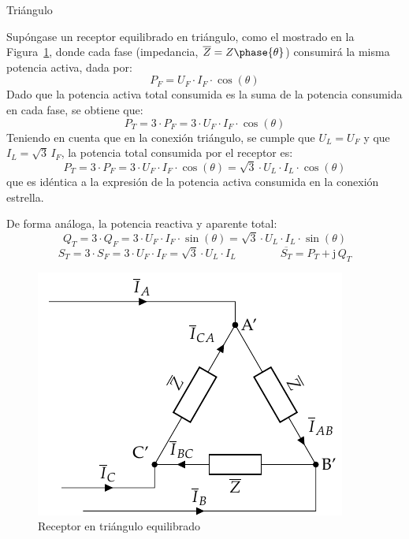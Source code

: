 \documentclass[11pt]{book} %
\makeatletter
\numberwithin{dummy}{section}
\theoremstyle{ocrenumbox}
\theoremstyle{blacknumex}
\theoremstyle{blacknumbox}
\theoremstyle{ocrenum}
\renewcommand{\subsubsection}{\@startsection {subsubsection}{3}{\z@}
{-2ex \@plus -0.1ex \@minus -.2ex}
{.2ex \@plus.2ex }
{\normalfont\small\sffamily\bfseries}}
\makeatother
\begin{document}
	\subsubsection{Triángulo}
	
	Supóngase un receptor equilibrado en triángulo, como el mostrado en la Figura~\ref{fig.trianguloEquilibrado_receptor_potencia}, donde cada fase (impedancia, $\overline{Z}=Z\phase{\theta}$) consumirá la misma potencia activa, dada por: 
	\begin{equation*}
	    P_F=U_{F}\cdot I_F \cdot \cos(\theta)
	\end{equation*}
	Dado que la potencia activa total consumida es la suma de la potencia consumida en cada fase, se obtiene que:
	\begin{equation*}
	    P_T=3\cdot P_F=3\cdot U_F\cdot I_F\cdot\cos(\theta)
	\end{equation*}
	Teniendo en cuenta que en la conexión triángulo, se cumple que $U_L=U_F$ y que $I_L=\sqrt{3}\,I_F$, la potencia total consumida por el receptor es: 
	\begin{equation}
	    \boxed{P_T=3\cdot P_F=3\cdot U_F\cdot {I_F}\cdot\cos(\theta)=\sqrt{3}\cdot U_L\cdot I_L\cdot\cos(\theta)}
	\end{equation}
	que es idéntica a la expresión de la potencia activa consumida en la conexión estrella.
	
	De forma análoga, la potencia reactiva y aparente total:
	\begin{equation}
	    \boxed{Q_T=3\cdot Q_F=3\cdot U_F\cdot {I_F}\cdot\sin(\theta)=\sqrt{3}\cdot U_L\cdot I_L\cdot\sin(\theta)}
	\end{equation}
	\begin{equation}
	    \boxed{S_T=3\cdot S_F=3\cdot U_F\cdot {I_F}=\sqrt{3}\cdot U_L\cdot I_L}  \qquad\qquad \boxed{\overline{S_T}=P_T+\mathrm{j}\,Q_T}
	\end{equation}
	
	\begin{figure}
	    \centering
	    \includegraphics{../figs/TrianguloEquilibrado_Receptor.pdf}
	    \caption{Receptor en triángulo equilibrado}
	    \label{fig.trianguloEquilibrado_receptor_potencia}
	\end{figure}
	
\end{document}
